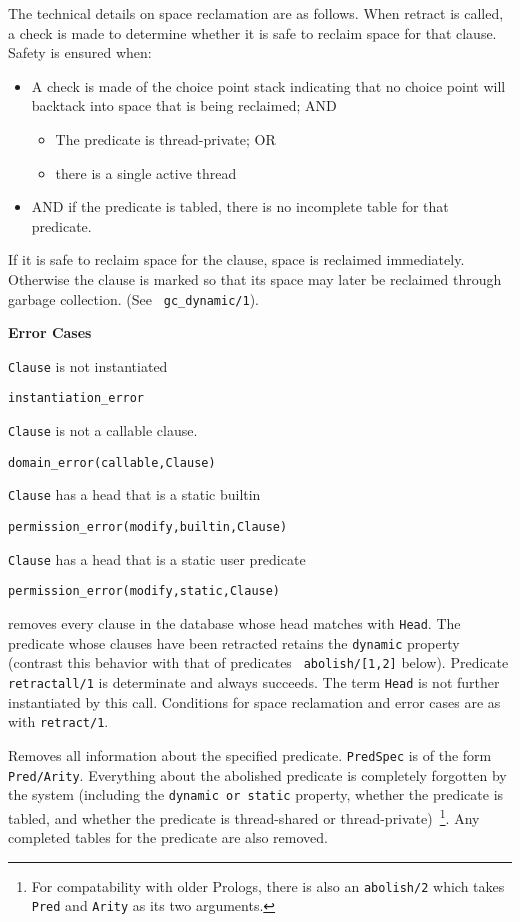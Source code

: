 \begin{description}
The technical details on space reclamation are as follows.  When
retract is called, a check is made to determine whether it is safe to
reclaim space for that clause.  Safety is ensured when:
\begin{itemize}
\item A check is made of the choice point stack indicating that no
  choice point will backtack into space that is being reclaimed; AND
\begin{itemize}
\item The predicate is thread-private; OR 
\item there is a single active thread
\end{itemize}
\item AND if the predicate is tabled, there is no incomplete table
     for that predicate.
\end{itemize}
If it is safe to reclaim space for the clause, space is reclaimed
immediately.  Otherwise the clause is marked so that its space may
later be reclaimed through garbage collection.  (See {\tt
  gc\_dynamic/1}).

{\bf Error Cases}
\bi
\item 	{\tt Clause} is not instantiated
\bi
\item 	{\tt instantiation\_error}
\ei
%
\item 	{\tt Clause} is not a callable clause.
\bi
\item 	{\tt domain\_error(callable,Clause)}
\ei
%
\item 	{\tt Clause} has a head that is a static builtin
\bi
\item 	{\tt permission\_error(modify,builtin,Clause)}
\ei
\item 	{\tt Clause} has a head that is a static user predicate
\bi
\item 	{\tt permission\_error(modify,static,Clause)}
\ei
%
\ei

 removes every
clause in the database whose head matches with {\tt Head}.  The
predicate whose clauses have been retracted retains the {\tt dynamic}
property (contrast this behavior with that of predicates {\tt
  abolish/[1,2]} below).  Predicate {\tt retractall/1} is determinate
and always succeeds.  The term {\tt Head} is not further instantiated
by this call.  Conditions for space reclamation and error cases are as
with {\tt retract/1}.

 Removes all
information about the specified predicate. {\tt PredSpec} is of the
form {\tt Pred/Arity}.  Everything about the abolished predicate is
completely forgotten by the system (including the {\tt dynamic or
  static} property, whether the predicate is tabled, and whether the
predicate is thread-shared or thread-private)~\footnote{For
  compatability with older Prologs, there is also an {\tt abolish/2}
  which takes {\tt Pred} and {\tt Arity} as its two arguments.}.  Any
completed tables for the predicate are also removed.


\end{description}
